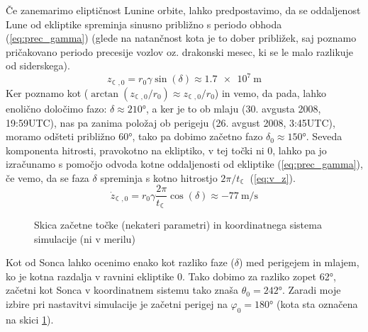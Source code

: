 \documentclass{article}
\begin{document}
Če zanemarimo eliptičnost Lunine orbite, lahko predpostavimo, da se oddaljenost Lune od ekliptike spreminja sinusno približno s periodo obhoda (\ref{eq:prec_gamma}) (glede na natančnost kota je to dober približek, saj poznamo pričakovano periodo precesije vozlov oz. drakonski mesec, ki se le malo razlikuje od siderskega).
\begin{equation}\label{eq:prec_gamma}
    z_{\leftmoon,0}=r_0\gamma\sin{(\delta)}\approx\SI{1,7e7}{\meter}
\end{equation}
Ker poznamo kot ($\arctan(z_{\leftmoon,0}/r_0)\approx z_{\leftmoon,0}/r_0$) in vemo, da pada, lahko enolično določimo fazo: $\delta\approx\ang{210}$, a ker je to ob mlaju (30. avgusta 2008, 19:59UTC), nas pa zanima položaj ob perigeju (26. avgust 2008, 3:45UTC), moramo odšteti približno \ang{60}, tako pa dobimo začetno fazo $\delta_0\approx\ang{150}$.
Seveda komponenta hitrosti, pravokotno na ekliptiko, v tej točki ni 0, lahko pa jo izračunamo s pomočjo odvoda kotne oddaljenosti od ekliptike (\ref{eq:prec_gamma}), če vemo, da se faza $\delta$ spreminja s kotno hitrostjo $2\pi/t_\leftmoon$ (\ref{eq:v_z}).
\begin{equation}\label{eq:v_z}
    \Dot{z}_{\leftmoon, 0}=r_0\gamma\frac{2\pi}{t_\leftmoon}\cos{(\delta)}\approx\SI{-77}{\meter\per\second}
\end{equation}
\begin{figure}[H]
    \centering
    
    \caption{Skica začetne točke (nekateri parametri) in koordinatnega sistema simulacije (ni v merilu)}
    \label{fig:sis}
\end{figure}

Kot od Sonca lahko ocenimo enako kot razliko faze ($\delta$) med perigejem in mlajem, ko je kotna razdalja v ravnini ekliptike 0. Tako dobimo za razliko zopet \ang{62}, začetni kot Sonca v koordinatnem sistemu tako znaša $\theta_0=\ang{242}$. Zaradi moje izbire pri nastavitvi simulacije je začetni perigej na $\varphi_0=\ang{180}$ (kota sta označena na skici \ref{fig:sis}).
\end{document}
